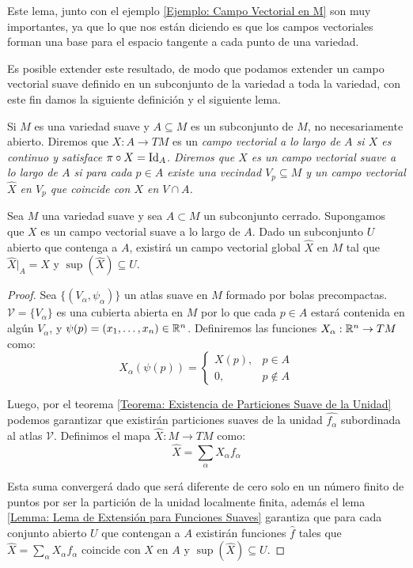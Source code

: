 Este lema, junto con el ejemplo \ref{Ejemplo: Campo Vectorial en M} son muy importantes, ya que lo que nos están diciendo es que los campos vectoriales forman una base para el espacio tangente a cada punto de una variedad.

Es posible extender este resultado, de modo que podamos extender un campo vectorial suave definido en un subconjunto de la variedad a toda la variedad, con este fin damos la siguiente definición y el siguiente lema.

\begin{definition}
	Si $M$ es una variedad suave y $A \subseteq M$ es un subconjunto de $M$, no necesariamente abierto. Diremos que $X: A \to TM$ es un \it{campo vectorial a lo largo de $A$} si $X$ es continuo y satisface $\pi \circ X = \mathrm{Id}_{A}$. Diremos que $X$ es un \it{campo vectorial suave a lo largo de $A$} si para cada $p \in A$ existe una vecindad $V_p \subseteq M$ y un campo vectorial $\hat{X}$ en $V_p$ que coincide con $X$ en $V \cap A$.
\end{definition}

\begin{lemma}
	Sea $M$ una variedad suave y sea $A \subset M$ un subconjunto cerrado. Supongamos que $X$ es un campo vectorial suave a lo largo de $A$. Dado un subconjunto $U$ abierto que contenga a $A$, existirá un campo vectorial global $\hat{X}$ en $M$ tal que $\hat{X}|_{A} = X$ y $\sup(\hat{X}) \subseteq U$.
\end{lemma}

\begin{proof}
	Sea $\{(V_\alpha,\psi_\alpha)\}$ un atlas suave en $M$ formado por bolas precompactas. $\mathcal{V}=\{V_\alpha\}$ es una cubierta abierta en $M$ por lo que cada $p \in A$ estará contenida en algún $V_\alpha$, y $\psi(p) = (x_1,\dots,x_n) \in \mathbb{R}^n$. Definiremos las funciones $X_\alpha: \mathbb{R}^n \to TM$ como:
	\[
		X_{\alpha}(\psi(p)) = \begin{cases}
			X(p), & p \in A    \\
			0,    & p \notin A
		\end{cases}
	\]

	Luego, por el teorema \ref{Teorema: Existencia de Particiones Suave de la Unidad} podemos garantizar que existirán particiones suaves de la unidad $\hat{f_\alpha}$ subordinada al atlas $\mathcal{V}$. Definimos el mapa $\hat{X}: M \to TM$ como:
	\[
		\hat{X} = \sum_{\alpha} X_{\alpha}f_\alpha
	\]

	Esta suma convergerá dado que será diferente de cero solo en un número finito de puntos por ser la partición de la unidad localmente finita, además el lema \ref{Lemma: Lema de Extensión para Funciones Suaves} garantiza que para cada conjunto abierto $U$ que contengan a $A$ existirán funciones $\hat{f}$ tales que $\hat{X} = \sum_\alpha  X_\alpha f_\alpha$ coincide con $X$ en $A$ y $\sup(\hat{X}) \subseteq U$.
\end{proof}

